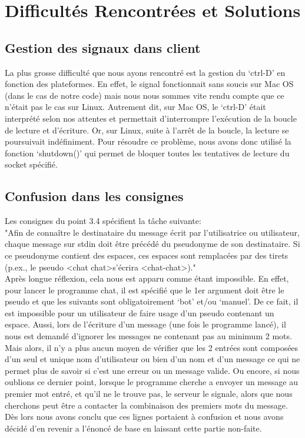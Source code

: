 \documentclass[utf8]{article}
\begin{document}
\section{Difficultés Rencontrées et Solutions}
\subsection{Gestion des signaux dans client}
La plus grosse difficulté que nous ayons rencontré est la gestion du `ctrl-D' en fonction des plateformes. En effet, le signal fonctionnait sans soucis sur Mac OS (dans le cas de notre code) 
mais nous nous sommes vite rendu compte que ce n'était pas le cas sur Linux. Autrement dit, sur Mac OS, le `ctrl-D' était interprété selon nos attentes et permettait d'interrompre l'exécution de la 
boucle de lecture et d'écriture. Or, sur Linux, suite à l'arrêt de la boucle, la lecture se poursuivait indéfiniment. Pour résoudre ce problème, nous avons donc utilisé la fonction 
`shutdown()' qui permet de bloquer toutes les tentatives de lecture du socket spécifié.

\subsection{Confusion dans les consignes}
Les consignes du point 3.4 spécifient la tâche suivante: \\
"Afin de connaître le destinataire du message écrit par l'utilisatrice ou utilisateur, chaque message sur stdin doit être précédé du pseudonyme de son destinataire. Si ce pseudonyme contient des espaces, ces
espaces sont remplacées par des tirets (p.ex., le pseudo \textless chat chat\textgreater s'écrira \textless chat-chat\textgreater)." \\
Après longue réflexion, cela nous est apparu comme étant impossible. En effet, pour lancer le programme chat, il est spécifié que le 1er argument doit être le pseudo et que les suivants sont obligatoirement 
`bot' et/ou `manuel'. De ce fait, il est impossible pour un utilisateur de faire usage d'un pseudo contenant un espace. Aussi, lors de l'écriture d'un message (une fois le programme lancé), il nous est demandé 
d'ignorer les messages ne contenant pas au minimum 2 mots. Mais alors, il n'y a plus aucun moyen de vérifier que les 2 entrées sont composées d'un seul et unique nom d'utilisateur ou bien d'un nom et d'un 
message ce qui ne permet plus de savoir si c'est une erreur ou un message valide. Ou encore, si nous oublions ce dernier point, lorsque le programme cherche a envoyer un message au premier mot entré, 
et qu'il ne le trouve pas, le serveur le signale, alors que nous cherchons peut être a contacter la combinaison des premiers mots du message. Dès lors nous avons conclu que ces lignes portaient 
à confusion et nous avons décidé d'en revenir a l'énoncé de base en laissant cette partie non-faite.
\end{document}
